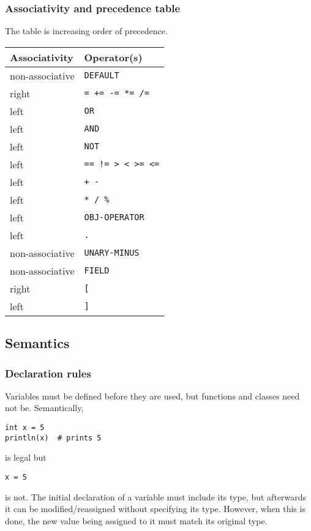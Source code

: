\documentclass{article}
\begin{document}
\subsubsection{Associativity and precedence table}
The table is increasing order of precedence.

\begin{table}[h]
\centering
\begin{tabular}{|l|l|}
\hline
Associativity   & Operator(s) \\ \hline
non-associative           & \texttt{DEFAULT} \\ \hline
right           & \texttt{= += -= *= /=} \\ \hline
left            & \texttt{OR} \\ \hline
left            & \texttt{AND} \\ \hline
left            & \texttt{NOT} \\ \hline
left            & \texttt{== != > < >= <=} \\ \hline
left            & \texttt{+ -} \\ \hline
left            & \texttt{* / \%} \\ \hline
left            & \texttt{OBJ-OPERATOR} \\ \hline
left            & \texttt{.} \\ \hline
non-associative & \texttt{UNARY-MINUS} \\
\hline
non-associative & \texttt{FIELD} \\ \hline
right & \texttt{[} \\ \hline
left & \texttt{]} \\ \hline
\end{tabular}
\end{table}

\subsection{Semantics}
\subsubsection{Declaration rules}
Variables must be defined before they are used, but functions and classes need not be. Semantically,
\begin{verbatim}
int x = 5
println(x)  # prints 5
\end{verbatim}
is legal but 
\begin{verbatim}
x = 5
\end{verbatim}
is not. The initial declaration of a variable must include its type, but afterwards it can be modified/reassigned without specifying its type. However, when this is done, the new value being assigned to it must match its original type.
\end{document}
